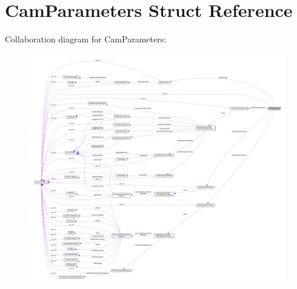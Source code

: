 \hypertarget{structCamParameters}{}\section{Cam\+Parameters Struct Reference}
\label{structCamParameters}


Collaboration diagram for Cam\+Parameters\+:\nopagebreak
\begin{figure}[H]
\begin{center}
\leavevmode
\includegraphics[width=350pt]{structCamParameters__coll__graph}
\end{center}
\end{figure}
